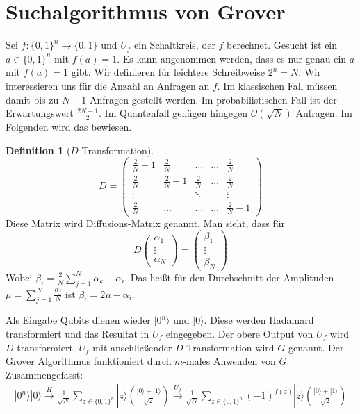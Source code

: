 \documentclass[a4paper, 12pt]{article}
\theoremstyle{plain}
\theoremstyle{definition}
\newtheorem{definition}[theorem]{Definition} %
\theoremstyle{lemma}
\theoremstyle{remark}
\theoremstyle{example}
\begin{document}
	\section{Suchalgorithmus von Grover}
	Sei $f:\{0,1\}^n \to \{0,1\}$ und $U_f$ ein Schaltkreis, der $f$ berechnet. Gesucht ist ein $a \in \{0,1\}^n$ mit $f(a) = 1$. Es kann angenommen werden, dass es nur genau ein $a$ mit $f(a) = 1$ gibt. Wir definieren für leichtere Schreibweise $2^n = N$. Wir interessieren uns für die Anzahl an Anfragen an $f$. Im klassischen Fall müssen damit bis zu $N-1$ Anfragen gestellt werden. Im probabilistischen Fall ist der Erwartungswert $\frac{2N-1}{2}$. Im Quantenfall genügen hingegen $\mathcal{O}(\sqrt{N})$ Anfragen. Im Folgenden wird das bewiesen.\\
	\begin{definition}[$D$ Transformation]
		\[D = \begin{pmatrix}
			\frac{2}{N} - 1 & \frac{2}{N} & \dots & \dots & \frac{2}{N}\\
			\frac{2}{N} & \frac{2}{N} - 1 & \frac{2}{N} & \dots & \frac{2}{N}\\
			\vdots & & \ddots & & \vdots\\
			\frac{2}{N} & \dots & \dots & \dots & \frac{2}{N} -1
		\end{pmatrix}\]
		Diese Matrix wird Diffusions-Matrix genannt. Man sieht, dass für \[D \begin{pmatrix}
			\alpha_1\\
			\vdots\\
			\alpha_N
		\end{pmatrix} = \begin{pmatrix}
			\beta_1\\
			\vdots\\
			\beta_N
		\end{pmatrix}\]
		Wobei $\beta_i = \frac{2}{N}\sum_{j=1}^N \alpha_k - \alpha_i$. Das heißt für den Durchschnitt der Amplituden $\mu = \sum_{j=1}^N \frac{\alpha_j}{N}$ ist $\beta_i = 2\mu - \alpha_i$.
	\end{definition}
	Als Eingabe Qubits dienen wieder $|0^n\rangle$ und $|0\rangle$. Diese werden Hadamard transformiert und das Resultat in $U_f$ eingegeben. Der obere Output von $U_f$ wird $D$ transformiert. $U_f$ mit anschließender $D$ Transformation wird $G$ genannt. Der Grover Algorithmus funktioniert durch $m$-males Anwenden von $G$. Zusammengefasst:
	\begin{eqnarray*}
		|0^n\rangle |0\rangle \overset{H}{\to} \frac{1}{\sqrt{N}} \sum_{z \in \{0,1\}^n} |z\rangle \left(\frac{|0\rangle +|1\rangle}{\sqrt{2}}\right) \overset{U_f}{\to} \frac{1}{\sqrt{N}} \sum_{z \in \{0,1\}^n} (-1)^{f(z)}|z\rangle \left(\frac{|0\rangle +|1\rangle}{\sqrt{2}}\right)
	\end{eqnarray*}
\end{document}
